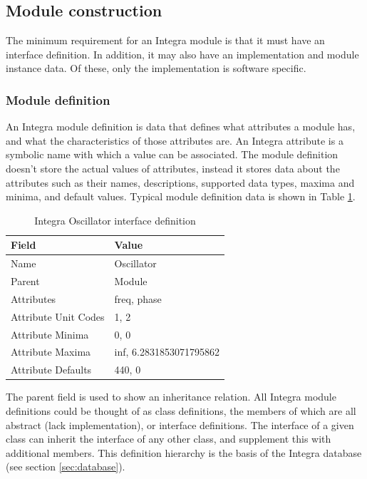 \documentclass[10pt,journal,final]{IEEEtran}
\begin{document}
\subsection{Module construction}\label{subsec:module_construction}

The minimum requirement for an Integra module is that it must have an interface definition. In addition, it may also have an implementation and module instance data. Of these, only the implementation is software specific.

\subsubsection{Module definition}\label{subsubsec:module_definition}

An Integra module definition is data that defines what attributes a module has, and what the characteristics of those attributes are. An Integra attribute is a symbolic name with which a value can be associated. The module definition doesn't store the actual values of attributes, instead it stores data about the attributes such as their names, descriptions, supported data types, maxima and minima, and default values. Typical module definition data is shown in Table \ref{tab:module_definition}.

\begin{table}[b]
\caption{Integra Oscillator interface definition}
\begin{center}
\begin{tabular}{|l|l|}
\hline
\textbf{Field} & \textbf{Value} \\
\hline
Name  & Oscillator \\
\hline
Parent  & Module \\
\hline
Attributes & freq, phase \\
\hline
Attribute Unit Codes & 1, 2 \\
\hline
Attribute Minima & 0, 0 \\
\hline
Attribute Maxima & inf, 6.2831853071795862 \\
\hline
Attribute Defaults & 440, 0 \\
\hline
\end{tabular} 
\end{center}
\label{tab:module_definition}
\end{table}

The parent field is used to show an inheritance relation. All Integra module definitions could be thought of as class definitions, the members of which are all abstract (lack implementation), or interface definitions. The interface of a given class can inherit the interface of any other class, and supplement this with additional members. This definition hierarchy is the basis of the Integra database (see section \ref{sec:database}). 
\end{document}
